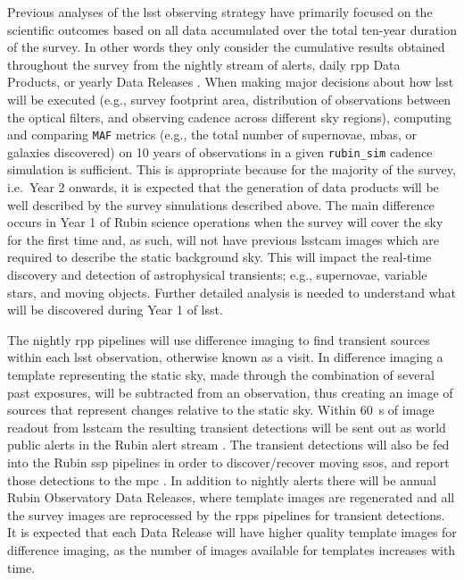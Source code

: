 \documentclass[preprintm,linenumbers]{aastex631}
\newcommand{\rubinsim}{\texttt{rubin\_sim}\xspace}
\newcommand{\maf}{\texttt{MAF}\xspace}
\begin{document}
	Previous analyses of the \gls*{lsst} observing strategy  \cite[e.g.,][]{lsstsciencecollaborationScienceDrivenOptimizationLSST2017, 2018Icar..303..181J,  2018arXiv181200515L, 2022ApJS..258....5A, 2022ApJS..263...23G, schwambTuningLegacySurvey2023,2023ApJS..268...11F} have primarily focused on the scientific outcomes based on all data accumulated over the total ten-year duration of the survey. In other words they only consider the cumulative results obtained throughout the survey from the nightly stream of alerts, daily \gls*{rpp}  Data Products, or yearly Data Releases \citep[described in][]{LSE-163}.  
 When making major decisions about how \gls*{lsst} will be executed (e.g., survey footprint area, distribution of observations between the optical filters, and observing cadence across different sky regions), computing and comparing \maf metrics (e.g., the total number of supernovae, \glspl*{mba}, or galaxies discovered) on 10 years of observations in a given \rubinsim cadence simulation is sufficient. 
 This is appropriate because for the majority of the survey, i.e.\ Year 2 onwards, it is expected that the generation of data products will be well described by the survey simulations described above.
 The main difference occurs in Year 1 of Rubin science operations when the survey will cover the sky for the first time and, as such, will not have previous \gls*{lsstcam} images which are required to describe the static background sky. This will impact the real-time discovery and detection of astrophysical transients; e.g., supernovae, variable stars, and moving objects. Further detailed analysis is needed to understand what will be discovered during Year 1 of \gls*{lsst}. 
	
	The nightly \gls*{rpp} pipelines will use difference imaging to find transient sources within each \gls*{lsst} observation, otherwise known as a visit. 
 In difference imaging a template representing the static sky, made through the combination of several past exposures, will be subtracted from an observation, thus creating an image of sources that represent changes relative to the static sky. 
 Within 60\ s of image readout from \gls*{lsstcam} the resulting transient detections will be sent out as world public alerts in the Rubin alert stream \citep{lsstSRD, 2019ApJ...873..111I, LDM-612, LSE-163, RTN-011}. 
 The transient detections will also be fed into the Rubin \gls*{ssp} pipelines in order to discover/recover moving \glspl*{sso}, and report those detections to the \gls*{mpc}  \citep{2019ApJ...873..111I,lsstMOPS,lsstSSP}. 
In addition to nightly alerts there will be annual Rubin Observatory Data Releases, where template images are regenerated and all the survey images are reprocessed by the \glspl*{rpp} pipelines for transient detections.
It is expected that each Data Release will have higher quality template images for difference imaging, as the number of images available for templates increases with time.
 
\end{document}
